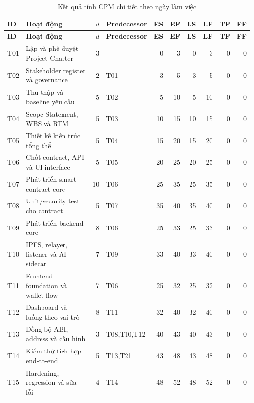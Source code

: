 \begin{landscape}
\begin{longtable}{| p{1.1cm} | p{5.2cm} | r | p{2.2cm} | r | r | r | r | r | r |}
\caption{Kết quả tính CPM chi tiết theo ngày làm việc}\label{tab:cpm-calculation}\\
\hline
\textbf{ID} & \textbf{Hoạt động} & \textbf{$d$} & \textbf{Predecessor} & \textbf{ES} & \textbf{EF} & \textbf{LS} & \textbf{LF} & \textbf{TF} & \textbf{FF} \\
\hline
\endfirsthead
\hline
\textbf{ID} & \textbf{Hoạt động} & \textbf{$d$} & \textbf{Predecessor} & \textbf{ES} & \textbf{EF} & \textbf{LS} & \textbf{LF} & \textbf{TF} & \textbf{FF} \\
\hline
\endhead
T01 & Lập và phê duyệt Project Charter & 3 & -- & 0 & 3 & 0 & 3 & 0 & 0 \\ \hline
T02 & Stakeholder register và governance & 2 & T01 & 3 & 5 & 3 & 5 & 0 & 0 \\ \hline
T03 & Thu thập và baseline yêu cầu & 5 & T02 & 5 & 10 & 5 & 10 & 0 & 0 \\ \hline
T04 & Scope Statement, WBS và RTM & 5 & T03 & 10 & 15 & 10 & 15 & 0 & 0 \\ \hline
T05 & Thiết kế kiến trúc tổng thể & 5 & T04 & 15 & 20 & 15 & 20 & 0 & 0 \\ \hline
T06 & Chốt contract, API và UI interface & 5 & T05 & 20 & 25 & 20 & 25 & 0 & 0 \\ \hline
T07 & Phát triển smart contract core & 10 & T06 & 25 & 35 & 25 & 35 & 0 & 0 \\ \hline
T08 & Unit/security test cho contract & 5 & T07 & 35 & 40 & 35 & 40 & 0 & 0 \\ \hline
T09 & Phát triển backend core & 8 & T06 & 25 & 33 & 25 & 33 & 0 & 0 \\ \hline
T10 & IPFS, relayer, listener và AI sidecar & 7 & T09 & 33 & 40 & 33 & 40 & 0 & 0 \\ \hline
T11 & Frontend foundation và wallet flow & 7 & T06 & 25 & 32 & 25 & 32 & 0 & 0 \\ \hline
T12 & Dashboard và luồng theo vai trò & 8 & T11 & 32 & 40 & 32 & 40 & 0 & 0 \\ \hline
T13 & Đồng bộ ABI, address và cấu hình & 3 & T08,T10,T12 & 40 & 43 & 40 & 43 & 0 & 0 \\ \hline
T14 & Kiểm thử tích hợp end-to-end & 5 & T13,T21 & 43 & 48 & 43 & 48 & 0 & 0 \\ \hline
T15 & Hardening, regression và sửa lỗi & 4 & T14 & 48 & 52 & 48 & 52 & 0 & 0 \\ \hline

\end{longtable}
\end{landscape}

